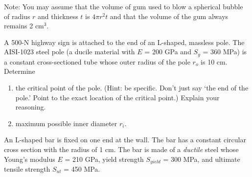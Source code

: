 \documentclass[
10pt,
a4paper,
openany,
svgnames,
]{book} %
\begin{document}
\begin{exercises}
    Note: You may assume that the volume of gum used to blow a spherical bubble of radius $r$ and thickness $t$ is $4\pi r^2 t$ and that the volume of the gum always remains 2 cm$^3$.

  \item A 500-N highway sign is attached to the end of an L-shaped, massless pole. The AISI-1023 steel pole (a ducile material with $E$ = 200 GPa and $S_y$ = 360 MPa) is a constant cross-sectioned tube whose outer radius of the pole $r_o$ is 10 cm. Determine

  \begin{enumerate}
  \item the critical point of the pole. (Hint: be specific. Don't just say `the end of the pole.' Point to the exact location of the critical point.) Explain your reasoning.
  \item maximum possible inner diameter $r_i$.
  \end{enumerate}
  
\item An L-shaped bar is fixed on one end at the wall. The bar has a constant circular cross section with the radius of 1 cm. The bar is made of a \emph{ductile} steel whose Young's modulus $E$ = 210 GPa, yield strength $S_{yield}$ = 300 MPa, and ultimate tensile strength $S_{ut}$ = 450 MPa.

  \begin{center}
  \end{center}


\end{exercises}
\end{document}
